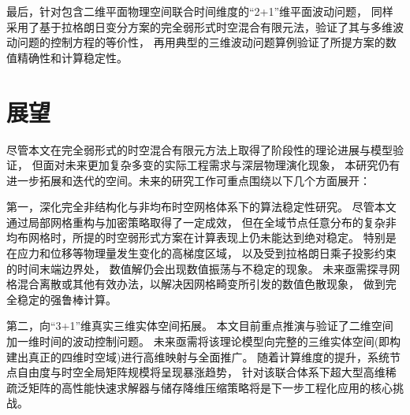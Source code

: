 最后，针对包含二维平面物理空间联合时间维度的“2+1”维平面波动问题，
同样采用了基于拉格朗日变分方案的完全弱形式时空混合有限元法，验证了其与多维波动问题的控制方程的等价性，
再用典型的三维波动问题算例验证了所提方案的数值精确性和计算稳定性。






\section{展望}

尽管本文在完全弱形式的时空混合有限元方法上取得了阶段性的理论进展与模型验证，
但面对未来更加复杂多变的实际工程需求与深层物理演化现象，
本研究仍有进一步拓展和迭代的空间。未来的研究工作可重点围绕以下几个方面展开：

第一，深化完全非结构化与非均布时空网格体系下的算法稳定性研究。
尽管本文通过局部网格重构与加密策略取得了一定成效，
但在全域节点任意分布的复杂非均布网格时，所提的时空弱形式方案在计算表现上仍未能达到绝对稳定。
特别是在应力和位移等物理量发生变化的高梯度区域，
以及受到拉格朗日乘子投影约束的时间末端边界处，
数值解仍会出现数值振荡与不稳定的现象。
未来亟需探寻网格混合离散或其他有效办法，以解决因网格畸变所引发的数值色散现象，
做到完全稳定的强鲁棒计算。


第二，向“3+1”维真实三维实体空间拓展。
本文目前重点推演与验证了二维空间加一维时间的波动控制问题。
未来亟需将该理论模型向完整的三维实体空间(即构建出真正的四维时空域)进行高维映射与全面推广。
随着计算维度的提升，系统节点自由度与时空全局矩阵规模将呈现暴涨趋势，
针对该联合体系下超大型高维稀疏泛矩阵的高性能快速求解器与储存降维压缩策略将是下一步工程化应用的核心挑战。

